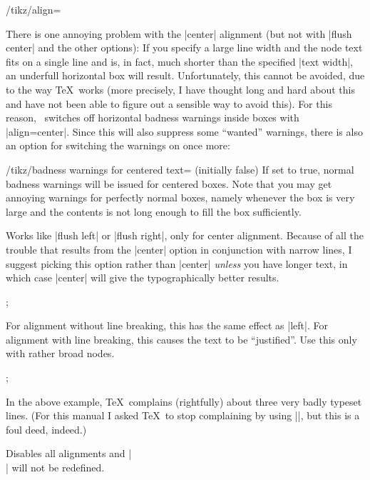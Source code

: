 \begin{key}{/tikz/align=}
\begin{description}
            There is one annoying problem with the |center| alignment (but not
            with |flush center| and the other options): If you specify a large
            line width and the node text fits on a single line and is, in fact,
            much shorter than the specified |text width|, an underfull
            horizontal box will result. Unfortunately, this cannot be avoided,
            due to the way \TeX\ works (more precisely, I have thought long and
            hard about this and have not been able to figure out a sensible way
            to avoid this). For this reason, \tikzname\ switches off horizontal
            badness warnings inside boxes with |align=center|. Since this will
            also suppress some ``wanted'' warnings, there is also an option for
            switching the warnings on once more:
            \begin{key}{/tikz/badness warnings for centered text= (initially false)}
                If set to true, normal badness warnings will be issued for
                centered boxes. Note that you may get annoying warnings for
                perfectly normal boxes, namely whenever the box is very large
                and the contents is not long enough to fill the box
                sufficiently.
            \end{key}
        \item[|align=|\declare{\texttt{flush center}}] Works like |flush left|
            or |flush right|, only for center alignment. Because of all the
            trouble that results from the |center| option in conjunction with
            narrow lines, I suggest picking this option rather than  |center|
            \emph{unless} you have longer text, in which case |center| will
            give the typographically better results.
\begin{codeexample}[]
\tikz {};
\end{codeexample}
        \item[|align=|\declare{|justify|}] For alignment without line breaking,
            this has the same effect as |left|. For alignment with line
            breaking, this causes the text to be ``justified''. Use this only
            with rather broad nodes.
{%
\begin{codeexample}[]
\tikz {};
\end{codeexample}
}
            In the above example, \TeX\ complains (rightfully) about three very
            badly typeset lines. (For this manual I asked \TeX\ to stop
            complaining by using ||, but this is a foul deed,
            indeed.)
        \item[|align=|\declare{|none|}] Disables all alignments and |\\| will
            not be redefined.
    \end{description}
\end{key}

